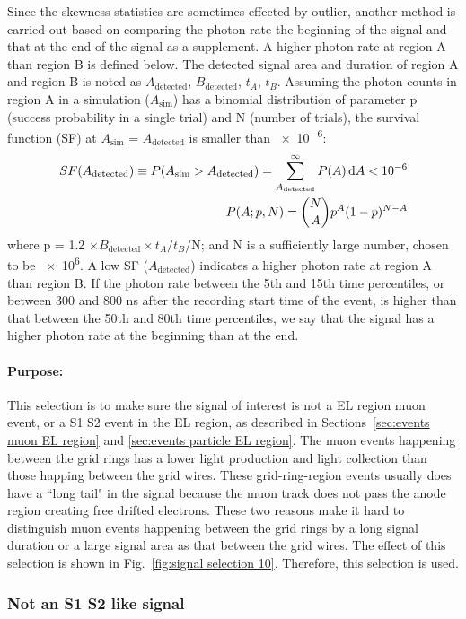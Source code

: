 Since the skewness statistics are sometimes effected by outlier, another method is carried out based on comparing the photon rate the beginning of the signal and that at the end of the signal as a supplement. A higher photon rate at region A than region B is defined below. The detected signal area and duration of region A and region B is noted as $A_{\text{detected}}$,  $B_{\text{detected}}$, $t_{A}$,  $t_{B}$. Assuming the photon counts in region A in a simulation ($A_{\text{sim}}$) has a binomial distribution of parameter p (success probability in a single trial) and N (number of trials), the survival function (SF) at $A_{\text{sim}}$ = $A_{\text{detected}}$ is smaller than \num{e-6}:
\begin{align}
SF (A_{\text{detected}}) \equiv P(A_{\text{sim}} > A_{\text{detected}}) = \sum_{A_{\text{detected}}}^{\infty} P (A) \operatorname{d}\!{A}< \num{e-6} \\
P (A; p, N) = \binom{N}{A} p^{A} (1-p)^{N-A}
\end{align}    
where p = \num{1.2} $\times B_{\text{detected}} \times t_{A}/t_{B}$/N; and N is a sufficiently large number, chosen to be \num{e6}. A low SF ($A_{\text{detected}}$) indicates a higher photon rate at region A than region B. If the photon rate between the 5th and 15th time percentiles, or between 300 and 800 ns after the recording start time of the event, is higher than that between the 50th and 80th time percentiles, we say that the signal has a higher photon rate at the beginning than at the end.

\paragraph{Purpose:}
This selection is to make sure the signal of interest is not a EL region muon event, or a S1 S2 event in the EL region, as described in Sections~\ref{sec:events muon EL region} and \ref{sec:events particle EL region}. The muon events happening between the grid rings has a lower light production and light collection than those happing between the grid wires. These grid-ring-region events usually does have a ``long tail" in the signal because the muon track does not pass the anode region creating free drifted electrons. These two reasons make it hard to distinguish muon events happening between the grid rings by a long signal duration or a large signal area as that between the grid wires. The effect of this selection is shown in Fig.~\ref{fig:signal selection 10}. Therefore, this selection is used.

\subsubsection{Not an S1 S2 like signal}
